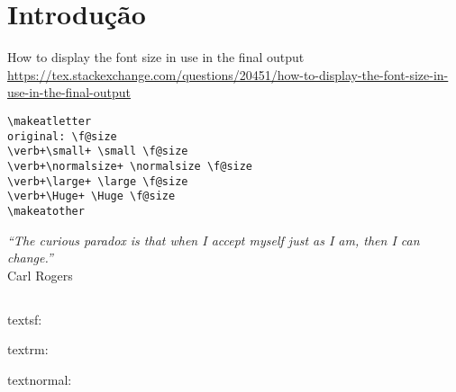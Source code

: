 

\cleardoublepage
{} %



\chapter[Introdução]{Introdução \showfont}
How to display the font size in use in the final output
\url{https://tex.stackexchange.com/questions/20451/how-to-display-the-font-size-in-use-in-the-final-output}

\begin{verbatim}
\makeatletter
original: \f@size
\verb+\small+ \small \f@size
\verb+\normalsize+ \normalsize \f@size
\verb+\large+ \large \f@size
\verb+\Huge+ \Huge \f@size
\makeatother
\end{verbatim}



\begin{flushright}
    \textit{``The curious paradox is that when I accept myself just as I am, then I can change.''}\\
    Carl Rogers
\end{flushright}




\newpage


\section[Some encoding tests]{\showfont}
\subsection{\showfont}
\subsubsection{\showfont}
\subsubsubsection{\showfont}


\textsf{textsf: \showfont}

\textrm{textrm: \showfont}

\textnormal{textnormal: \showfont}

